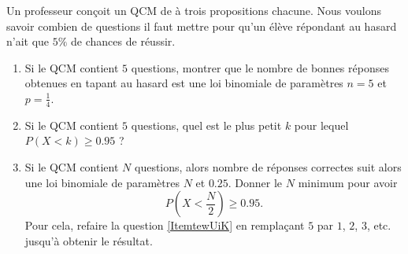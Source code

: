 
\begin{exercice}\label{exoPremiere-0092}

    Un professeur conçoit un QCM de à trois propositions chacune. Nous voulons savoir combien de questions il faut mettre pour qu'un élève répondant au hasard n'ait que \( 5\%\) de chances de réussir.

    \begin{enumerate}
        \item
            Si le QCM contient \( 5\) questions, montrer que le nombre de bonnes réponses obtenues en tapant au hasard est une loi binomiale de paramètres \( n=5\) et \( p=\frac{1}{ 4 }\).
        \item   \label{ItemtewUiK}
            Si le QCM contient \( 5\) questions, quel est le plus petit \( k\) pour lequel \( P(X<k)\geq 0.95\) ?
        \item
            Si le QCM contient \( N\) questions, alors nombre de réponses correctes suit alors une loi binomiale de paramètres \( N\) et \( 0.25\). Donner le \( N\) minimum pour avoir 
            \begin{equation}
                P(X<\frac{ N }{ 2 })\geq 0.95.
            \end{equation}
            Pour cela, refaire la question \ref{ItemtewUiK} en remplaçant \( 5\) par \( 1\), \( 2\), \( 3\), etc. jusqu'à obtenir le résultat.
    \end{enumerate}

\end{exercice}
